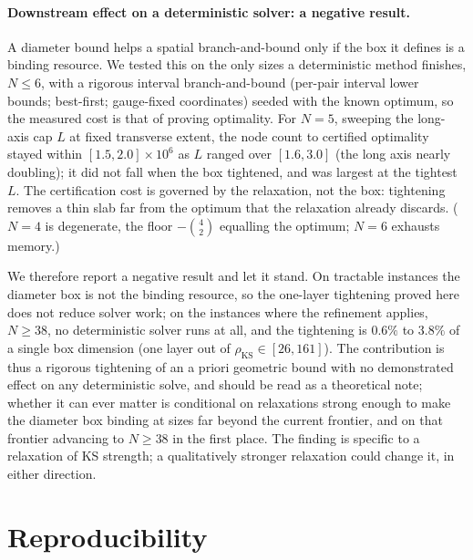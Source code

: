 \documentclass[11pt]{article}
\theoremstyle{remark}
\newcommand{\KS}{\mathrm{KS}}
\begin{document}
\paragraph{Downstream effect on a deterministic solver: a negative result.}
A diameter bound helps a spatial branch-and-bound only if the box it defines is a binding resource. We tested this on the only sizes a deterministic method finishes, $N\le6$, with a rigorous interval branch-and-bound (per-pair interval lower bounds; best-first; gauge-fixed coordinates) seeded with the known optimum, so the measured cost is that of proving optimality. For $N=5$, sweeping the long-axis cap $L$ at fixed transverse extent, the node count to certified optimality stayed within $[1.5,2.0]\times10^6$ as $L$ ranged over $[1.6,3.0]$ (the long axis nearly doubling); it did not fall when the box tightened, and was largest at the tightest $L$. The certification cost is governed by the relaxation, not the box: tightening removes a thin slab far from the optimum that the relaxation already discards. ($N=4$ is degenerate, the floor $-\binom42$ equalling the optimum; $N=6$ exhausts memory.)

We therefore report a negative result and let it stand. On tractable instances the diameter box is not the binding resource, so the one-layer tightening proved here does not reduce solver work; on the instances where the refinement applies, $N\ge38$, no deterministic solver runs at all, and the tightening is $0.6\%$ to $3.8\%$ of a single box dimension (one layer out of $\rho_\KS\in[26,161]$). The contribution is thus a rigorous tightening of an a priori geometric bound with no demonstrated effect on any deterministic solve, and should be read as a theoretical note; whether it can ever matter is conditional on relaxations strong enough to make the diameter box binding at sizes far beyond the current frontier, and on that frontier advancing to $N\ge38$ in the first place. The finding is specific to a relaxation of KS strength; a qualitatively stronger relaxation could change it, in either direction.

\section*{Reproducibility}
\end{document}
